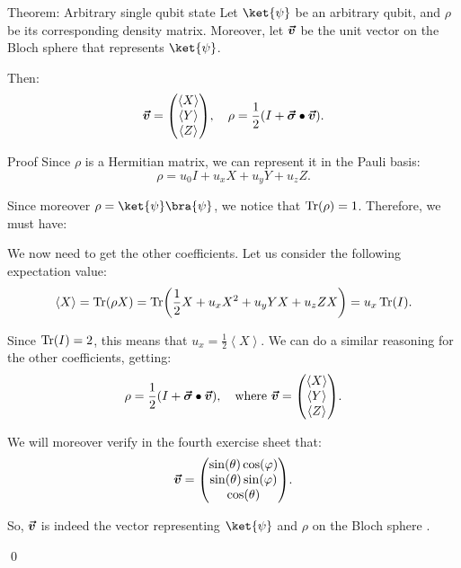 \documentclass[a4paper]{article}
\begin{document}
\begin{parag}{Theorem: Arbitrary single qubit state}
    Let $\ket{\psi}$ be an arbitrary qubit, and $\rho$ be its corresponding density matrix. Moreover, let $\bm{\protect\vec{v}}$ be the unit vector on the Bloch sphere that represents $\ket{\psi}$.

    Then: 
    \[\bvec{v} = \begin{pmatrix} \left\langle X \right\rangle \\ \left\langle Y \right\rangle \\ \left\langle Z \right\rangle \end{pmatrix}, \mathspace \rho = \frac{1}{2}\left(I + \bvec{\sigma} \dotprod \bvec{v}\right).\]
    

    \begin{subparag}{Proof}
        Since $\rho$ is a Hermitian matrix, we can represent it in the Pauli basis: 
        \[\rho = u_0 I + u_x X + u_y Y + u_z Z.\]
        
        Since moreover $\rho = \ket{\psi}\bra{\psi}$, we notice that $\Tr\left(\rho\right) = 1$. Therefore, we must have: 
        

        We now need to get the other coefficients. Let us consider the following expectation value: 
        \[\left\langle X \right\rangle = \Tr\left(\rho X\right) = \Tr\left(\frac{1}{2}X + u_x X^2 + u_y YX + u_z ZX\right) = u_x\Tr\left(I\right).\]
        
        Since $\Tr\left(I\right) = 2$, this means that $u_x = \frac{1}{2} \left\langle X \right\rangle$. We can do a similar reasoning for the other coefficients, getting: 
        \[\rho = \frac{1}{2}\left(I + \bvec{\sigma} \dotprod \bvec{v}\right), \mathspace \text{where } \bvec{v} = \begin{pmatrix} \left\langle X \right\rangle \\ \left\langle Y \right\rangle \\ \left\langle Z \right\rangle \end{pmatrix}.\]

        We will moreover verify in the fourth exercise sheet that: 
        \[\bvec{v} = \begin{pmatrix} \sin\left(\theta\right)\cos\left(\phi\right) \\ \sin\left(\theta\right)\sin\left(\phi\right) \\ \cos\left(\theta\right) \end{pmatrix}.\]

        So, $\bm{\protect\vec{v}}$ is indeed the vector representing $\ket{\psi}$ and $\rho$ on the Bloch sphere .

        \qed
    \end{subparag}
\end{parag}
\end{document}
